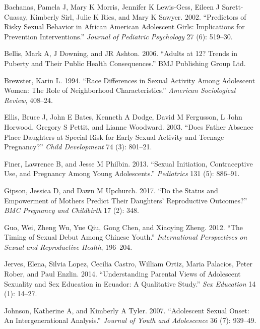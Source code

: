 \documentclass[
]{article}
\newlength{\cslhangindent}
\newenvironment{cslreferences}%
  {\setlength{\parindent}{0pt}%
  \everypar{\setlength{\hangindent}{\cslhangindent}}\ignorespaces}%
  {\par}
\begin{document}
\hypertarget{refs}{}
\begin{cslreferences}
\leavevmode\hypertarget{ref-bachanas2002predictors}{}%
Bachanas, Pamela J, Mary K Morris, Jennifer K Lewis-Gess, Eileen J
Sarett-Cuasay, Kimberly Sirl, Julie K Ries, and Mary K Sawyer. 2002.
``Predictors of Risky Sexual Behavior in African American Adolescent
Girls: Implications for Prevention Interventions.'' \emph{Journal of
Pediatric Psychology} 27 (6): 519--30.

\leavevmode\hypertarget{ref-bellis2006adults}{}%
Bellis, Mark A, J Downing, and JR Ashton. 2006. ``Adults at 12? Trends
in Puberty and Their Public Health Consequences.'' BMJ Publishing Group
Ltd.

\leavevmode\hypertarget{ref-brewster1994race}{}%
Brewster, Karin L. 1994. ``Race Differences in Sexual Activity Among
Adolescent Women: The Role of Neighborhood Characteristics.''
\emph{American Sociological Review}, 408--24.

\leavevmode\hypertarget{ref-ellis2003does}{}%
Ellis, Bruce J, John E Bates, Kenneth A Dodge, David M Fergusson, L John
Horwood, Gregory S Pettit, and Lianne Woodward. 2003. ``Does Father
Absence Place Daughters at Special Risk for Early Sexual Activity and
Teenage Pregnancy?'' \emph{Child Development} 74 (3): 801--21.

\leavevmode\hypertarget{ref-finer2013sexual}{}%
Finer, Lawrence B, and Jesse M Philbin. 2013. ``Sexual Initiation,
Contraceptive Use, and Pregnancy Among Young Adolescents.''
\emph{Pediatrics} 131 (5): 886--91.

\leavevmode\hypertarget{ref-gipson2017status}{}%
Gipson, Jessica D, and Dawn M Upchurch. 2017. ``Do the Status and
Empowerment of Mothers Predict Their Daughters' Reproductive Outcomes?''
\emph{BMC Pregnancy and Childbirth} 17 (2): 348.

\leavevmode\hypertarget{ref-guo2012timing}{}%
Guo, Wei, Zheng Wu, Yue Qiu, Gong Chen, and Xiaoying Zheng. 2012. ``The
Timing of Sexual Debut Among Chinese Youth.'' \emph{International
Perspectives on Sexual and Reproductive Health}, 196--204.

\leavevmode\hypertarget{ref-jerves2014understanding}{}%
Jerves, Elena, Silvia Lopez, Cecilia Castro, William Ortiz, Maria
Palacios, Peter Rober, and Paul Enzlin. 2014. ``Understanding Parental
Views of Adolescent Sexuality and Sex Education in Ecuador: A
Qualitative Study.'' \emph{Sex Education} 14 (1): 14--27.

\leavevmode\hypertarget{ref-johnson2007adolescent}{}%
Johnson, Katherine A, and Kimberly A Tyler. 2007. ``Adolescent Sexual
Onset: An Intergenerational Analysis.'' \emph{Journal of Youth and
Adolescence} 36 (7): 939--49.


\end{cslreferences}
\end{document}
